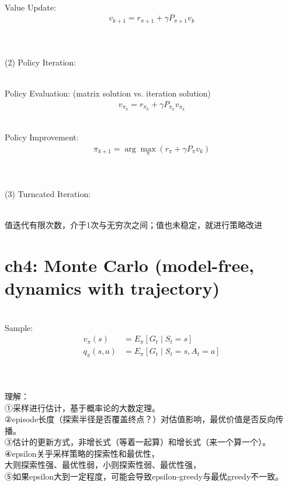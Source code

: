 \documentclass{article}
\begin{document}
~ \\[3pt]
Value Update: 
\begin{align*}
    v_{k+1} = r_{\pi+1} + \gamma P_{\pi+1} v_{k} 
\end{align*}


~ \\[3pt]
~ \\[3pt]
(2) Policy Iteration: 

~ \\[3pt]
Policy Evaluation: (matrix solution vs. iteration solution)
\begin{align*}
    v_{\pi_{k}} = r_{\pi_{k}} + \gamma P_{\pi_{k}} v_{\pi_{k}} 
\end{align*}

~ \\[3pt]
Policy Improvement: 
\begin{align*}
    \pi_{k+1} = \arg \max_{\pi} 
    \left( r_{\pi} + \gamma P_{\pi} v_{k} \right) 
\end{align*}


~ \\[3pt]
~ \\[3pt]
(3) Turncated Iteration: 
~ \\[3pt]

~ \\[3pt]
\begin{CJK}{UTF8}{gbsn}
    值迭代有限次数，介于1次与无穷次之间；值也未稳定，就进行策略改进 \\[3pt]
\end{CJK}


\newpage
\section*{ch4: Monte Carlo (model-free, dynamics with trajectory)}


~ \\[3pt]
Sample: 
\begin{align*}
    v_{\pi}(s) 
      &= E_{\pi} \left[ G_{t} \mid S_{t}=s \right] \\[3pt]
    q_{\pi}(s, a) 
      &= E_{\pi} \left[ G_{t} \mid S_{t}=s, A_{t}=a \right] \\[3pt]
\end{align*}


~ \\[3pt]
\begin{CJK}{UTF8}{gbsn}
    理解： \\[3pt]
    ①采样进行估计，基于概率论的大数定理。 \\[3pt]
    ②episode长度（探索半径是否覆盖终点？）对估值影响，最优价值是否反向传播。 \\[3pt]
    ③估计的更新方式，非增长式（等着一起算）和增长式（来一个算一个）。 \\[3pt]
    ④epsilon关乎采样策略的探索性和最优性， \\[3pt]
    大则探索性强、最优性弱，小则探索性弱、最优性强， \\[3pt]
    ⑤如果epsilon大到一定程度，可能会导致epsilon-greedy与最优greedy不一致。 \\[3pt]
\end{CJK}
\end{document}
